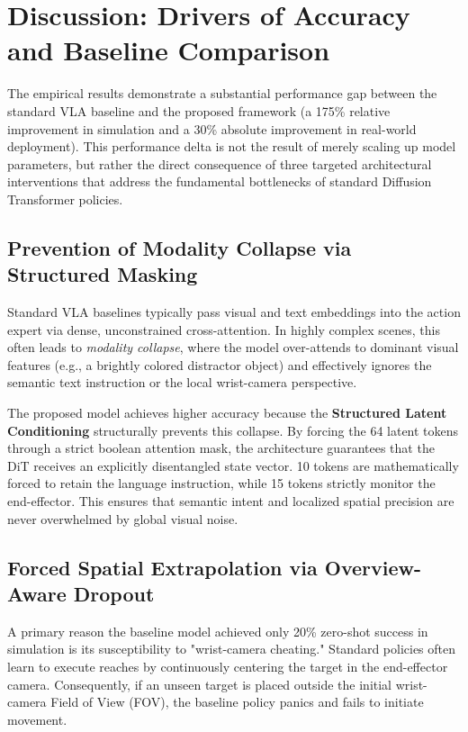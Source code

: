 \section{Discussion: Drivers of Accuracy and Baseline Comparison}
\label{sec:accuracy_discussion}

The empirical results demonstrate a substantial performance gap between the standard VLA baseline and the proposed framework (a 175\% relative improvement in simulation and a 30\% absolute improvement in real-world deployment). This performance delta is not the result of merely scaling up model parameters, but rather the direct consequence of three targeted architectural interventions that address the fundamental bottlenecks of standard Diffusion Transformer policies.

\subsection{Prevention of Modality Collapse via Structured Masking}
Standard VLA baselines typically pass visual and text embeddings into the action expert via dense, unconstrained cross-attention. In highly complex scenes, this often leads to \textit{modality collapse}, where the model over-attends to dominant visual features (e.g., a brightly colored distractor object) and effectively ignores the semantic text instruction or the local wrist-camera perspective. 

The proposed model achieves higher accuracy because the \textbf{Structured Latent Conditioning} structurally prevents this collapse. By forcing the 64 latent tokens through a strict boolean attention mask, the architecture guarantees that the DiT receives an explicitly disentangled state vector. 10 tokens are mathematically forced to retain the language instruction, while 15 tokens strictly monitor the end-effector. This ensures that semantic intent and localized spatial precision are never overwhelmed by global visual noise.

\subsection{Forced Spatial Extrapolation via Overview-Aware Dropout}
A primary reason the baseline model achieved only 20\% zero-shot success in simulation is its susceptibility to "wrist-camera cheating." Standard policies often learn to execute reaches by continuously centering the target in the end-effector camera. Consequently, if an unseen target is placed outside the initial wrist-camera Field of View (FOV), the baseline policy panics and fails to initiate movement.


